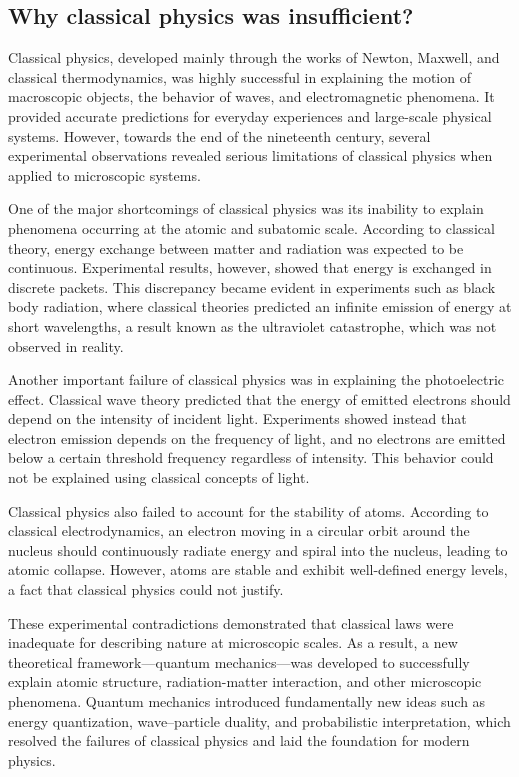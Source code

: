 \documentclass[14pt,a4paper]{extarticle}
\begin{document}
\subsection{Why classical physics was insufficient?}

Classical physics, developed mainly through the works of Newton, Maxwell, and classical thermodynamics, was highly successful in explaining the motion of macroscopic objects, the behavior of waves, and electromagnetic phenomena. It provided accurate predictions for everyday experiences and large-scale physical systems. However, towards the end of the nineteenth century, several experimental observations revealed serious limitations of classical physics when applied to microscopic systems.

One of the major shortcomings of classical physics was its inability to explain phenomena occurring at the atomic and subatomic scale. According to classical theory, energy exchange between matter and radiation was expected to be continuous. Experimental results, however, showed that energy is exchanged in discrete packets. This discrepancy became evident in experiments such as black body radiation, where classical theories predicted an infinite emission of energy at short wavelengths, a result known as the ultraviolet catastrophe, which was not observed in reality.

Another important failure of classical physics was in explaining the photoelectric effect. Classical wave theory predicted that the energy of emitted electrons should depend on the intensity of incident light. Experiments showed instead that electron emission depends on the frequency of light, and no electrons are emitted below a certain threshold frequency regardless of intensity. This behavior could not be explained using classical concepts of light.

Classical physics also failed to account for the stability of atoms. According to classical electrodynamics, an electron moving in a circular orbit around the nucleus should continuously radiate energy and spiral into the nucleus, leading to atomic collapse. However, atoms are stable and exhibit well-defined energy levels, a fact that classical physics could not justify.

These experimental contradictions demonstrated that classical laws were inadequate for describing nature at microscopic scales. As a result, a new theoretical framework—quantum mechanics—was developed to successfully explain atomic structure, radiation-matter interaction, and other microscopic phenomena. Quantum mechanics introduced fundamentally new ideas such as energy quantization, wave–particle duality, and probabilistic interpretation, which resolved the failures of classical physics and laid the foundation for modern physics.
\end{document}
